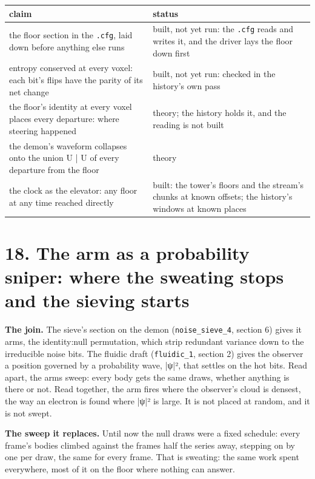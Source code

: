 {\small
\setlength{\tabcolsep}{6pt}
\begin{longtable}{>{\RaggedRight\arraybackslash}p{}>{\RaggedRight\arraybackslash}p{}}
\toprule
claim & status \\
\midrule
\endhead
the floor section in the \texttt{.\allowbreak{}cfg}, laid down before anything else runs & built, not yet run: the \texttt{.\allowbreak{}cfg} reads and writes it, and the driver lays the floor down first \\
entropy conserved at every voxel: each bit's flips have the parity of its net change & built, not yet run: checked in the history's own pass \\
the floor's identity at every voxel places every departure: where steering happened & theory; the history holds it, and the reading is not built \\
the demon's waveform collapses onto the union U | U of every departure from the floor & theory \\
the clock as the elevator: any floor at any time reached directly & built: the tower's floors and the stream's chunks at known offsets; the history's windows at known places \\
\bottomrule
\end{longtable}
}

\section{\texorpdfstring{18. The arm as a probability sniper: where the sweating stops and the sieving starts}{18. The arm as a probability sniper: where the sweating stops and the sieving starts}}

\textbf{The join.} The sieve's section on the demon (\texttt{noise\_\allowbreak{}sieve\_\allowbreak{}4}, section 6) gives it arms, the identity:null permutation, which strip redundant variance down to the irreducible noise bits. The fluidic draft (\texttt{fluidic\_\allowbreak{}1}, section 2) gives the observer a position governed by a probability wave, |ψ|², that settles on the hot bits. Read apart, the arms sweep: every body gets the same draws, whether anything is there or not. Read together, the arm fires where the observer's cloud is densest, the way an electron is found where |ψ|² is large. It is not placed at random, and it is not swept.

\textbf{The sweep it replaces.} Until now the null draws were a fixed schedule: every frame's bodies climbed against the frames half the series away, stepping on by one per draw, the same for every frame. That is sweating: the same work spent everywhere, most of it on the floor where nothing can answer.

